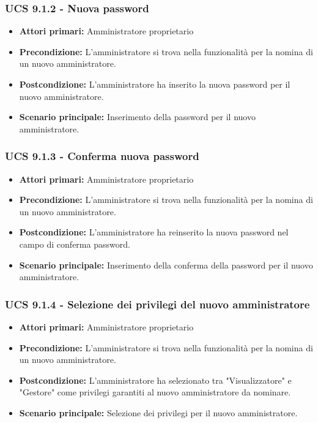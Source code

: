 \subsubsection{UCS 9.1.2 - Nuova password}
\begin{itemize}
\item \textbf{Attori primari:} Amministratore proprietario
\item \textbf{Precondizione:}  L'amministratore si trova nella funzionalità per la nomina di un nuovo amministratore.
\item \textbf{Postcondizione:} L'amministratore ha inserito la nuova password per il nuovo amministratore.
\item \textbf{Scenario principale:} Inserimento della password per il nuovo amministratore.
\end{itemize}

\subsubsection{UCS 9.1.3 - Conferma nuova password}
\begin{itemize}
\item \textbf{Attori primari:} Amministratore proprietario
\item \textbf{Precondizione:} L'amministratore si trova nella funzionalità per la nomina di un nuovo amministratore.
\item \textbf{Postcondizione:} L'amministratore ha reinserito la nuova password nel campo di conferma password.
\item \textbf{Scenario principale:} Inserimento della conferma della password per il nuovo amministratore.
\end{itemize}

\subsubsection{UCS 9.1.4 - Selezione dei privilegi del nuovo amministratore}
\begin{itemize}
\item \textbf{Attori primari:} Amministratore proprietario
\item \textbf{Precondizione:} L'amministratore si trova nella funzionalità per la nomina di un nuovo amministratore.
\item \textbf{Postcondizione:} L'amministratore ha selezionato tra "Visualizzatore" e "Gestore" come privilegi garantiti al nuovo amministratore da nominare.
\item \textbf{Scenario principale:} Selezione dei privilegi per il nuovo amministratore.
\end{itemize}


